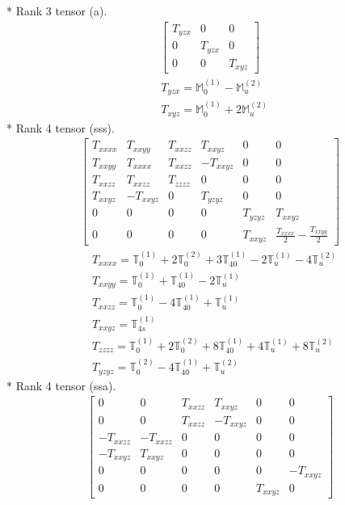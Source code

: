 \documentclass[fleqn,8pt,landscape]{jsarticle}
\begin{document}
* Rank 3 tensor (a).
\begin{align*}
\begin{bmatrix} T_{yzx} & 0 & 0 \\ 0 & T_{yzx} & 0 \\ 0 & 0 & T_{xyz} \end{bmatrix}
\end{align*}
\begin{align*}
& T_{yzx} = \mathbb{M}_{0}^{(1)} - \mathbb{M}_{u}^{(2)} \\
& T_{xyz} = \mathbb{M}_{0}^{(1)} + 2 \mathbb{M}_{u}^{(2)}
\end{align*}
* Rank 4 tensor (sss).
\begin{align*}
\begin{bmatrix} T_{xxxx} & T_{xxyy} & T_{xxzz} & T_{xxyz} & 0 & 0 \\ T_{xxyy} & T_{xxxx} & T_{xxzz} & - T_{xxyz} & 0 & 0 \\ T_{xxzz} & T_{xxzz} & T_{zzzz} & 0 & 0 & 0 \\ T_{xxyz} & - T_{xxyz} & 0 & T_{yzyz} & 0 & 0 \\ 0 & 0 & 0 & 0 & T_{yzyz} & T_{xxyz} \\ 0 & 0 & 0 & 0 & T_{xxyz} & \frac{T_{xxxx}}{2} - \frac{T_{xxyy}}{2} \end{bmatrix}
\end{align*}
\begin{align*}
& T_{xxxx} = \mathbb{T}_{0}^{(1)} + 2 \mathbb{T}_{0}^{(2)} + 3 \mathbb{T}_{40}^{(1)} - 2 \mathbb{T}_{u}^{(1)} - 4 \mathbb{T}_{u}^{(2)} \\
& T_{xxyy} = \mathbb{T}_{0}^{(1)} + \mathbb{T}_{40}^{(1)} - 2 \mathbb{T}_{u}^{(1)} \\
& T_{xxzz} = \mathbb{T}_{0}^{(1)} - 4 \mathbb{T}_{40}^{(1)} + \mathbb{T}_{u}^{(1)} \\
& T_{xxyz} = \mathbb{T}_{4s}^{(1)} \\
& T_{zzzz} = \mathbb{T}_{0}^{(1)} + 2 \mathbb{T}_{0}^{(2)} + 8 \mathbb{T}_{40}^{(1)} + 4 \mathbb{T}_{u}^{(1)} + 8 \mathbb{T}_{u}^{(2)} \\
& T_{yzyz} = \mathbb{T}_{0}^{(2)} - 4 \mathbb{T}_{40}^{(1)} + \mathbb{T}_{u}^{(2)}
\end{align*}
* Rank 4 tensor (ssa).
\begin{align*}
\begin{bmatrix} 0 & 0 & T_{xxzz} & T_{xxyz} & 0 & 0 \\ 0 & 0 & T_{xxzz} & - T_{xxyz} & 0 & 0 \\ - T_{xxzz} & - T_{xxzz} & 0 & 0 & 0 & 0 \\ - T_{xxyz} & T_{xxyz} & 0 & 0 & 0 & 0 \\ 0 & 0 & 0 & 0 & 0 & - T_{xxyz} \\ 0 & 0 & 0 & 0 & T_{xxyz} & 0 \end{bmatrix}
\end{align*}
\end{document}
